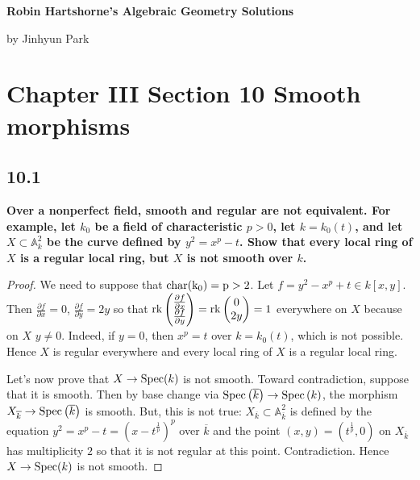 \documentclass[11pt]{amsart}          %
\newcommand{\bbA}{\mathbb{A}}
\newcommand{\spec}{{\rm Spec}}
\newcommand{\rk}{{\rm rk}}
\begin{document}
\begin{center}
\bf
\large Robin Hartshorne's Algebraic Geometry Solutions
\end{center}
\begin{center}
by Jinhyun Park
\end{center}
\vskip0.5cm

\section*{Chapter III Section 10 Smooth morphisms}

\subsection*{10.1}\textbf{Over a nonperfect field, smooth and regular are not equivalent. For example, let $k_0$ be a field of characteristic $p>0$, let $k = k_0 (t)$, and let $X \subset \bbA_k ^2$ be the curve defined by $y^2 = x^p - t$. Show that every local ring of $X$ is a regular local ring, but $X$ is not smooth over $k$.}

\begin{proof} We need to suppose that $\rm{char} (k_0) = p >2$. Let $f = y^2 - x^p + t \in k[x,y]$. Then $\frac{\partial f}{\partial x} = 0$, $\frac{\partial f}{\partial y} = 2y$ so that $\rk \begin{pmatrix} \frac{\partial f}{\partial x} \\ \frac{\partial f}{\partial y} \end{pmatrix} = \rk \begin{pmatrix} 0 \\ 2y \end{pmatrix} = 1$ everywhere on $X$ because on $X$ $y \not = 0$. Indeed, if $y=0$, then $x^p = t$ over $k= k_0 (t)$, which is not possible. Hence $X$ is regular everywhere and every local ring of $X$ is a regular local ring.

Let's now prove that $X \to \spec (k)$ is not smooth. Toward contradiction, suppose that it is smooth. Then by base change via $\spec \left( \overline{k} \right) \to \spec \left( k \right)$, the morphism $X _{\overline{k}} \to \spec \left( \overline{k} \right)$ is smooth. But, this is not true: $X_{\overline{k}} \subset \bbA_{\overline{k}} ^2$ is defined by the equation $y^2 = x^p - t = \left( x - t^{\frac{1}{p}} \right)^p$ over $\overline{k}$ and the point $(x,y) = \left( t^{\frac{1}{p}} , 0 \right) $ on $X_{\overline{k}}$ has multiplicity $2$ so that it is not regular at this point. Contradiction. Hence $X \to \spec (k)$ is not smooth.
\end{proof}
\end{document}
